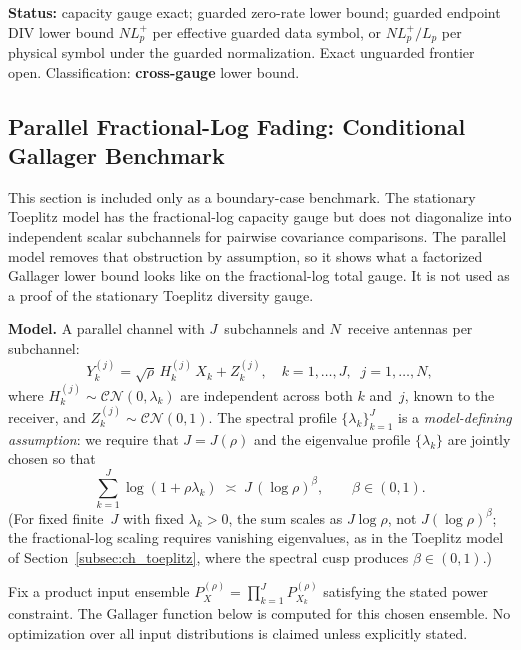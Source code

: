 \documentclass[lettersize,onecolumn]{IEEEtran}
\newcommand{\snr}{\rho}
\begin{document}
\textbf{Status:} capacity gauge exact; guarded zero-rate lower bound;
guarded endpoint DIV lower bound $NL_p^+$ per effective
guarded data symbol, or $NL_p^+/L_p$ per physical symbol under the
guarded normalization. Exact unguarded frontier open. Classification:
\textbf{cross-gauge} lower bound.

\subsection{Parallel Fractional-Log Fading: Conditional Gallager
Benchmark}\label{subsec:ch_parallel}

This section is included only as a boundary-case benchmark. The
stationary Toeplitz model has the fractional-log capacity gauge but
does not diagonalize into independent scalar subchannels for pairwise
covariance comparisons. The parallel model removes that obstruction
by assumption, so it shows what a factorized Gallager lower bound
looks like on the fractional-log total gauge. It is not used as a
proof of the stationary Toeplitz diversity gauge.

\textbf{Model.}
A parallel channel with $J$~subchannels and $N$~receive antennas
per subchannel:
\begin{equation}\label{eq:model_parallel}
Y_k^{(j)} = \sqrt{\snr}\,H_k^{(j)}\,X_k + Z_k^{(j)},
\quad k=1,\dots,J,\;\; j=1,\dots,N,
\end{equation}
where $H_k^{(j)} \sim \mathcal{CN}(0,\lambda_k)$ are independent
across both $k$ and~$j$, known to the receiver, and
$Z_k^{(j)} \sim \mathcal{CN}(0,1)$. The spectral profile
$\{\lambda_k\}_{k=1}^{J}$ is a \emph{model-defining assumption}:
we require that $J = J(\snr)$ and the eigenvalue profile
$\{\lambda_k\}$ are jointly chosen so that
\begin{equation}\label{eq:spectral_condition}
\sum_{k=1}^{J}\log(1+\snr\lambda_k) \;\asymp\;
J\,(\log\snr)^\beta, \qquad \beta \in (0,1).
\end{equation}
(For fixed finite~$J$ with fixed $\lambda_k > 0$, the sum scales
as $J\log\snr$, not $J(\log\snr)^\beta$; the fractional-log scaling
requires vanishing eigenvalues, as in the Toeplitz model of
Section~\ref{subsec:ch_toeplitz}, where the spectral cusp produces
$\beta \in (0,1)$.)

Fix a product input ensemble
$P_X^{(\snr)} = \prod_{k=1}^{J} P_{X_k}^{(\snr)}$ satisfying
the stated power constraint. The Gallager function below is
computed for this chosen ensemble. No optimization over all input
distributions is claimed unless explicitly stated.
\end{document}
